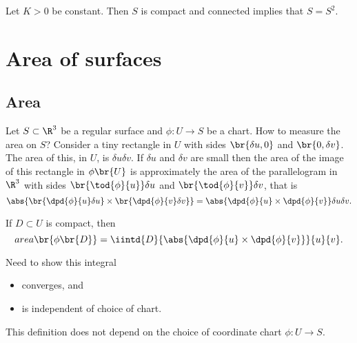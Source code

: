 \begin{corollary}
Let $ K > 0 $ be constant. Then $ S $ is compact and connected implies that $ S = S^2 $.
\end{corollary}

\pagebreak

\section{Area of surfaces}


\subsection{Area}

Let $ S \subset \R^3 $ be a regular surface and $ \phi : U \to S $ be a chart. How to measure the area on $ S $? Consider a tiny rectangle in $ U $ with sides $ \br{\delta u, 0} $ and $ \br{0, \delta v} $. The area of this, in $ U $, is $ \delta u\delta v $. If $ \delta u $ and $ \delta v $ are small then the area of the image of this rectangle in $ \phi\br{U} $ is approximately the area of the parallelogram in $ \R^3 $ with sides $ \br{\tod{\phi}{u}}\delta u $ and $ \br{\tod{\phi}{v}}\delta v $, that is
$$ \abs{\br{\dpd{\phi}{u}\delta u} \times \br{\dpd{\phi}{v}\delta v}} = \abs{\dpd{\phi}{u} \times \dpd{\phi}{v}}\delta u\delta v. $$

\begin{definition}
If $ D \subset U $ is compact, then
$$ area\br{\phi\br{D}} = \iintd{D}{\abs{\dpd{\phi}{u} \times \dpd{\phi}{v}}}{u}{v}. $$
\end{definition}

Need to show this integral
\begin{itemize}
\item converges, and
\item is independent of choice of chart.
\end{itemize}

\begin{proposition}
This definition does not depend on the choice of coordinate chart $ \phi : U \to S $.
\end{proposition}

